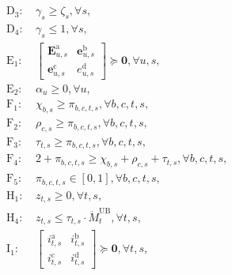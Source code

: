 \documentclass[10pt,journal,compsoc]{IEEEtran}
\theoremstyle{myremark}
\theoremstyle{myexample}
\begin{document}
\begin{appendices}
\begin{figure} [!t]
{{\begin{align*}
	\\ 
	& & \mathrm{D}_{3}: ~ & \gamma_s \geq \zeta_s, \forall s,
	\\ 
	& & \mathrm{D}_{4}: ~ & \gamma_s \leq 1, \forall s, 
	\\ 
	& & \mathrm{E}_{1}: ~ & \left[ 
		 	 			   					\begin{matrix}
		 	 			   					   	\mathbf{E}_{u,s}^\mathrm{a}
		 	 			   					   	& 
		 	 			   					   	\mathbf{e}_{u,s}^\mathrm{b}
		 	 			   					   	\\
		 	 			   					    \mathbf{e}_{u,s}^\mathrm{c}
		 	 			   					    & 
		 	 			   					    e_{u,s}^\mathrm{d}
		 	 			   				  	\end{matrix} 
		  			   					\right] 
		  					   		\succcurlyeq \mathbf{0}, \forall u, s,
	\\ 
	& & \mathrm{E}_{2}: ~ & \alpha_u \geq 0, \forall u,
	\\ 
	& & \mathrm{F}_{1}: ~ & \chi_{b,s} \geq \pi_{b,c,t,s}, \forall b, c, t, s, 
	\\ 
	& & \mathrm{F}_{2}: ~ & \rho_{c,s} \geq \pi_{b,c,t,s}, \forall b, c, t, s,
	\\ 
	& & \mathrm{F}_{3}: ~ & \tau_{t,s} \geq \pi_{b,c,t,s}, \forall b, c, t, s,
	\\ 
	& & \mathrm{F}_{4}: ~ & 2 + \pi_{b,c,t,s} \geq \chi_{b,s} + \rho_{c,s} + \tau_{t,s}, \forall b, c, t, s,
	\\ 
	& & \mathrm{F}_{5}: ~ & \pi_{b,c,t,s} \in \left[ 0, 1 \right], \forall b, c, t, s,
	\\ 
	& & \mathrm{H}_{1}: ~ & z_{t,s} \geq 0, \forall t, s,
	\\ 
	& & \mathrm{H}_{4}: ~ & z_{t,s} \leq \tau_{t,s} \cdot \ddot{M}_{t}^\mathrm{UB}, \forall t, s,
	\\ 
	& & \mathrm{I}_{1}: ~ & \left[ 
					   			 			   					\begin{matrix}
					   			 			   					   	i_{t,s}^\mathrm{a}
					   			 			   					   	& 
					   			 			   					   	i_{t,s}^\mathrm{b}
					   			 			   					   	\\
					   			 			   					    i_{t,s}^\mathrm{c}
					   			 			   					    & 
					   			 			   					    i_{t,s}^\mathrm{d}
					   			 			   				  	\end{matrix} 
					   		 			   					\right] 
					   		 					   		\succcurlyeq \mathbf{0}, \forall t, s,

\end{align*}}}
\end{figure}
\end{appendices}
\end{document}
